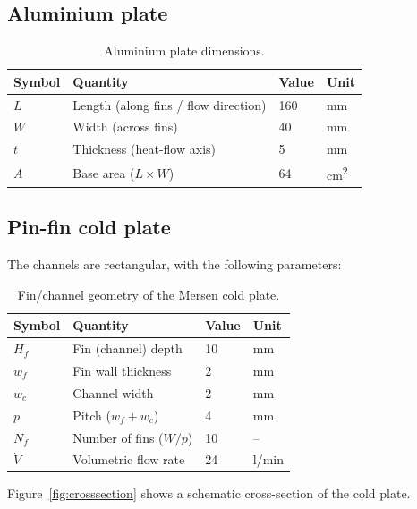 \documentclass[a4paper,11pt]{article}
\begin{document}
\subsection{Aluminium plate}

\begin{table}[H]
\centering
\caption{Aluminium plate dimensions.}
\begin{tabular}{llll}
\toprule
Symbol & Quantity & Value & Unit \\
\midrule
$L$  & Length (along fins / flow direction) & 160 & \si{mm} \\
$W$  & Width (across fins)                  &  40 & \si{mm} \\
$t$  & Thickness (heat-flow axis)           &   5 & \si{mm} \\
$A$  & Base area ($L\times W$)              &  64 & \si{cm^2} \\
\bottomrule
\end{tabular}
\end{table}

\subsection{Pin-fin cold plate}

The channels are rectangular, with the following parameters:

\begin{table}[H]
\centering
\caption{Fin/channel geometry of the Mersen cold plate.}
\begin{tabular}{llll}
\toprule
Symbol & Quantity & Value & Unit \\
\midrule
$H_f$    & Fin (channel) depth                      & 10  & \si{mm} \\
$w_f$    & Fin wall thickness                       &  2  & \si{mm} \\
$w_c$    & Channel width                            &  2  & \si{mm} \\
$p$      & Pitch ($w_f + w_c$)                      &  4  & \si{mm} \\
$N_f$    & Number of fins ($W / p$)                 & 10  & --      \\
$\dot{V}$ & Volumetric flow rate                   & 24  & \si{l/min} \\
\bottomrule
\end{tabular}
\end{table}

Figure~\ref{fig:crosssection} shows a schematic cross-section of the cold plate.
\end{document}
